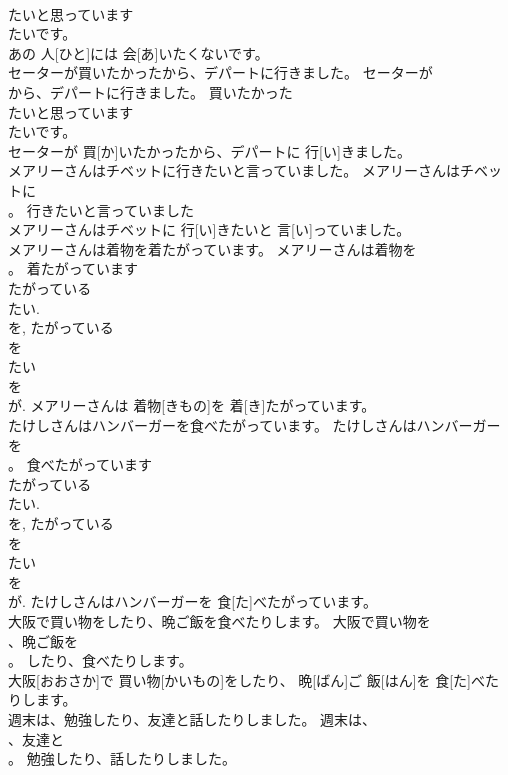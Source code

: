 \documentclass[8pt]{extreport}
\begin{document}
\begin{CJK}{UTF8}{min}
\\	たいと思っています 
\\	たいです。
\\	あの 人[ひと]には 会[あ]いたくないです。	
\\	セーターが買いたかったから、デパートに行きました。	セーターが
\\	から、デパートに行きました。	買いたかった	
\\	たいと思っています 
\\	たいです。
\\	セーターが 買[か]いたかったから、デパートに 行[い]きました。	
\\	メアリーさんはチベットに行きたいと言っていました。	メアリーさんはチベットに
\\	。	行きたいと言っていました	
\\	メアリーさんはチベットに 行[い]きたいと 言[い]っていました。	
\\	メアリーさんは着物を着たがっています。	メアリーさんは着物を
\\	。	着たがっています	
\\	たがっている 
\\	たい. 
\\	を, たがっている 
\\	を 
\\	たい 
\\	を 
\\	が.	メアリーさんは 着物[きもの]を 着[き]たがっています。	
\\	たけしさんはハンバーガーを食べたがっています。	たけしさんはハンバーガーを
\\	。	食べたがっています	
\\	たがっている 
\\	たい. 
\\	を, たがっている 
\\	を 
\\	たい 
\\	を 
\\	が.	たけしさんはハンバーガーを 食[た]べたがっています。	
\\	大阪で買い物をしたり、晩ご飯を食べたりします。	大阪で買い物を
\\	、晩ご飯を
\\	。	したり、食べたりします。	
\\	大阪[おおさか]で 買い物[かいもの]をしたり、 晩[ばん]ご 飯[はん]を 食[た]べたりします。	
\\	週末は、勉強したり、友達と話したりしました。	週末は、
\\	、友達と
\\	。	勉強したり、話したりしました。	

\end{CJK}
\end{document}
